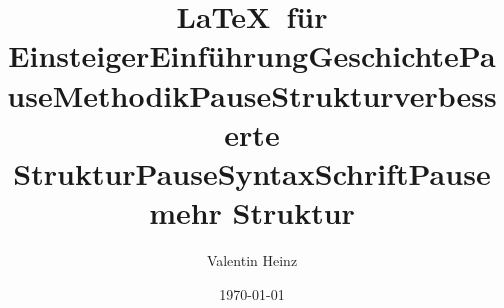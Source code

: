 \documentclass[]{beamer}
\date{}
\title{\LaTeX \ für Einsteiger}
\author{Valentin Heinz}
\date{\today}
\begin{document}
\maketitle
\title{Einführung}


\title{Geschichte}


\title{Pause}


\title{Methodik}


\title{Pause}


\title{Struktur}


\title{verbesserte Struktur}


\title{Pause}


\title{Syntax}

\title{Schrift}


\title{Pause}


\title{mehr Struktur}

\end{document}
